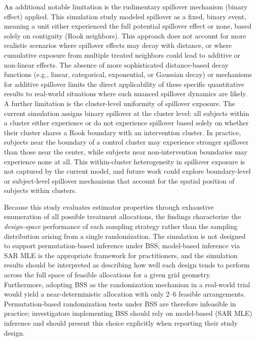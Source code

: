 \documentclass{article}[11pt]
\begin{document}
An additional notable limitation is the rudimentary spillover mechanism (binary effect) applied. This simulation study modeled spillover as a fixed, binary event, meaning a unit either experienced the full potential spillover effect or none, based solely on contiguity (Rook neighbors). This approach does not account for more realistic scenarios where spillover effects may decay with distance, or where cumulative exposure from multiple treated neighbors could lead to additive or non-linear effects. The absence of more sophisticated distance-based decay functions (e.g., linear, categorical, exponential, or Gaussian decay) or mechanisms for additive spillover limits the direct applicability of these specific quantitative results to real-world situations where such nuanced spillover dynamics are likely. %
A further limitation is the cluster-level uniformity of spillover exposure. The current simulation assigns binary spillover at the cluster level: all subjects within a cluster either experience or do not experience spillover based solely on whether their cluster shares a Rook boundary with an intervention cluster. In practice, subjects near the boundary of a control cluster may experience stronger spillover than those near the center, while subjects near non-intervention boundaries may experience none at all. This within-cluster heterogeneity in spillover exposure is not captured by the current model, and future work could explore boundary-level or subject-level spillover mechanisms that account for the spatial position of subjects within clusters.

Because this study evaluates estimator properties through exhaustive enumeration of all possible treatment allocations, the findings characterize the \emph{design-space} performance of each sampling strategy rather than the sampling distribution arising from a single randomization. The simulation is not designed to support permutation-based inference under BSS; model-based inference via SAR MLE is the appropriate framework for practitioners, and the simulation results should be interpreted as describing how well each design tends to perform across the full space of feasible allocations for a given grid geometry. Furthermore, adopting BSS as the randomization mechanism in a real-world trial would yield a near-deterministic allocation with only 2--6 feasible arrangements. Permutation-based randomization tests under BSS are therefore infeasible in practice; investigators implementing BSS should rely on model-based (SAR MLE) inference and should present this choice explicitly when reporting their study design.
\end{document}
